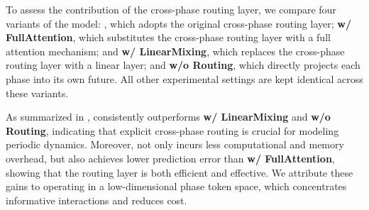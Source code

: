 To assess the contribution of the cross-phase routing layer, we compare four variants of the model: 
\textbf{\sysname}, which adopts the original cross-phase routing layer; 
\textbf{w/ FullAttention}, which substitutes the cross-phase routing layer with a full attention mechanism; and
\textbf{w/ LinearMixing}, which replaces the cross-phase routing layer with a linear layer; and 
\textbf{w/o Routing}, which directly projects each phase into its own future.
All other experimental settings are kept identical across these variants. 

As summarized in , \sysname consistently outperforms \textbf{w/ LinearMixing} and \textbf{w/o Routing}, indicating that explicit cross-phase routing is crucial for modeling periodic dynamics. Moreover, \sysname not only incurs less computational and memory overhead, but also achieves lower prediction error than \textbf{w/ FullAttention}, showing that the routing layer is both efficient and effective. We attribute these gains to operating in a low-dimensional phase token space, which concentrates informative interactions and reduces cost.


